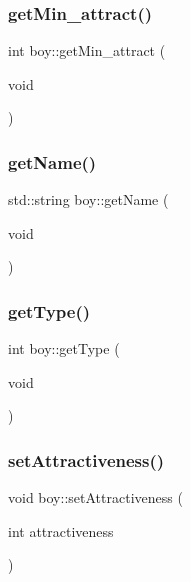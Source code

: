 \mbox{\label{classboy_a1127d720a42a8b99e8b8b5232a01888b}} 
\subsubsection{\texorpdfstring{get\+Min\+\_\+attract()}{getMin\_attract()}}
{\footnotesize\ttfamily int boy\+::get\+Min\+\_\+attract (\begin{DoxyParamCaption}\item[{void}]{ }\end{DoxyParamCaption})}

\mbox{\label{classboy_a670dc0382568e874db1b457e922c4410}} 
\subsubsection{\texorpdfstring{get\+Name()}{getName()}}
{\footnotesize\ttfamily std\+::string boy\+::get\+Name (\begin{DoxyParamCaption}\item[{void}]{ }\end{DoxyParamCaption})}

\mbox{\label{classboy_a4449dd8bd85b8fb071624c00843d4879}} 
\subsubsection{\texorpdfstring{get\+Type()}{getType()}}
{\footnotesize\ttfamily int boy\+::get\+Type (\begin{DoxyParamCaption}\item[{void}]{ }\end{DoxyParamCaption})}

\mbox{\label{classboy_a97f0db302fe7af4f96865b7cf101e882}} 
\subsubsection{\texorpdfstring{set\+Attractiveness()}{setAttractiveness()}}
{\footnotesize\ttfamily void boy\+::set\+Attractiveness (\begin{DoxyParamCaption}\item[{int}]{attractiveness }\end{DoxyParamCaption})}

